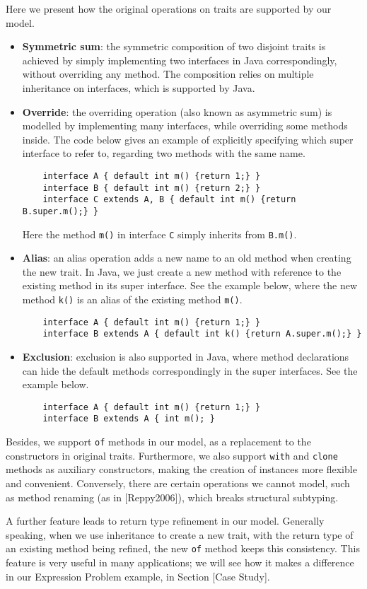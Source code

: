 Here we present how the original operations on traits are supported by our model.
\begin{itemize}
\item \textbf{Symmetric sum}: the symmetric composition of two disjoint traits is achieved by simply implementing two interfaces in Java correspondingly, without overriding any method. The composition relies on multiple inheritance on interfaces, which is supported by Java.
\item \textbf{Override}: the overriding operation (also known as asymmetric sum) is modelled by implementing many interfaces, while overriding some methods inside. The code below gives an example of explicitly specifying which super interface to refer to, regarding two methods with the same name.
    \begin{lstlisting}
    interface A { default int m() {return 1;} }
    interface B { default int m() {return 2;} }
    interface C extends A, B { default int m() {return B.super.m();} } 
    \end{lstlisting}
    Here the method \texttt{m()} in interface \texttt{C} simply inherits from \texttt{B.m()}.
\item \textbf{Alias}: an alias operation adds a new name to an old method when creating the new trait. In Java, we just create a new method with reference to the existing method in its super interface. See the example below, where the new method \texttt{k()} is an alias of the existing method \texttt{m()}.
    \begin{lstlisting}
    interface A { default int m() {return 1;} }
    interface B extends A { default int k() {return A.super.m();} }
    \end{lstlisting}
\item \textbf{Exclusion}: exclusion is also supported in Java, where method declarations can hide the default methods correspondingly in the super interfaces. See the example below.
    \begin{lstlisting}
    interface A { default int m() {return 1;} }
    interface B extends A { int m(); }
    \end{lstlisting}
\end{itemize}

Besides, we support \texttt{of} methods in our model, as a replacement to the constructors in original traits. Furthermore, we also support \texttt{with} and \texttt{clone} methods as auxiliary constructors, making the creation of instances more flexible and convenient. Conversely, there are certain operations we cannot model, such as method renaming (as in [Reppy2006]), which breaks structural subtyping.

A further feature leads to return type refinement in our model. Generally speaking, when we use inheritance to create a new trait, with the return type of an existing method being refined, the new \texttt{of} method keeps this consistency. This feature is very useful in many applications; we will see how it makes a difference in our Expression Problem example, in Section [Case Study]. 
